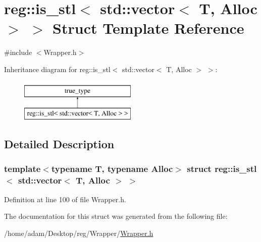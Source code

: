 \hypertarget{structreg_1_1is__stl_3_01std_1_1vector_3_01_t_00_01_alloc_01_4_01_4}{}\section{reg\+:\+:is\+\_\+stl$<$ std\+:\+:vector$<$ T, Alloc $>$ $>$ Struct Template Reference}
\label{structreg_1_1is__stl_3_01std_1_1vector_3_01_t_00_01_alloc_01_4_01_4}


{\ttfamily \#include $<$Wrapper.\+h$>$}

Inheritance diagram for reg\+:\+:is\+\_\+stl$<$ std\+:\+:vector$<$ T, Alloc $>$ $>$\+:\begin{figure}[H]
\begin{center}
\leavevmode
\includegraphics[height=2.000000cm]{structreg_1_1is__stl_3_01std_1_1vector_3_01_t_00_01_alloc_01_4_01_4}
\end{center}
\end{figure}


\subsection{Detailed Description}
\subsubsection*{template$<$typename T, typename Alloc$>$\newline
struct reg\+::is\+\_\+stl$<$ std\+::vector$<$ T, Alloc $>$ $>$}



Definition at line 100 of file Wrapper.\+h.



The documentation for this struct was generated from the following file\+:\begin{DoxyCompactItemize}
\item 
/home/adam/\+Desktop/reg/\+Wrapper/\hyperlink{_wrapper_8h}{Wrapper.\+h}\end{DoxyCompactItemize}
